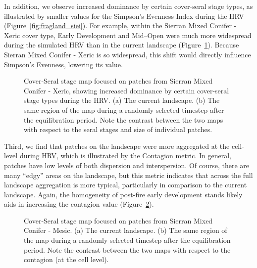 
In addition, we observe increased dominance by certain cover-seral stage types, as illustrated by smaller values for the Simpson's Evenness Index during the HRV (Figure~\ref{fig:fragland_siei}). For example, within the Sierran Mixed Conifer - Xeric cover type, Early Development and Mid--Open were much more widespread during the simulated HRV than in the current landscape (Figure~\ref{fig:patchmaps2}). Because Sierran Mixed Conifer - Xeric is so widespread, this shift would directly influence Simpson's Evenness, lowering its value.

\begin{figure}[!htbp]
  \centering
  \caption{Cover-Seral stage map focused on patches from Sierran Mixed Conifer - Xeric, showing increased dominance by certain cover-seral stage types during the HRV. (a) The current landscape. (b) The same region of the map during a randomly selected timestep after the equilibration period. Note the contrast between the two maps with respect to the seral stages and size of individual patches.} 
  \label{fig:patchmaps2}
\end{figure}


Third, we find that patches on the landscape were more aggregated at the cell-level during HRV, which is illustrated by the Contagion metric. In general, patches have low levels of both dispersion and interspersion. Of course, there are many ``edgy'' areas on the landscape, but this metric indicates that across the full landscape aggregation is more typical, particularly in comparison to the current landscape. Again, the homogeneity of post-fire early development stands likely aids in increasing the contagion value (Figure~\ref{fig:patchmaps3}). 

\begin{figure}[!htbp]
  \centering
  \caption{Cover-Seral stage map focused on patches from Sierran Mixed Conifer - Mesic. (a) The current landscape. (b) The same region of the map during a randomly selected timestep after the equilibration period. Note the contrast between the two maps with respect to the contagion (at the cell level).} 
  \label{fig:patchmaps3} %
\end{figure}

